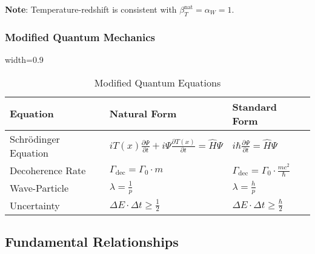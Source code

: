 \documentclass[12pt,a4paper]{article}
\newcommand{\Tfield}{T(x)}
\newcommand{\tablescale}{0.9}
\begin{document}
	\textbf{Note}: Temperature-redshift is consistent with \(\beta_T^{\text{nat}} = \alpha_W = 1\).
	
	\subsubsection{Modified Quantum Mechanics}
	\label{subsec:quantum}
	
	\begin{table}[htbp]
		\centering
		\begin{adjustbox}{width=\tablescale\textwidth}
			\begin{tabular}{lll}
				\toprule
				\textbf{Equation} & \textbf{Natural Form} & \textbf{Standard Form} \\
				\midrule
				Schrödinger Equation & \(i \Tfield \frac{\partial \Psi}{\partial t} + i \Psi \frac{\partial \Tfield}{\partial t} = \hat{H} \Psi\) & \(i \hbar \frac{\partial \Psi}{\partial t} = \hat{H} \Psi\) \\
				Decoherence Rate & \(\Gamma_{\text{dec}} = \Gamma_0 \cdot m\) & \(\Gamma_{\text{dec}} = \Gamma_0 \cdot \frac{m c^2}{\hbar}\) \\
				Wave-Particle & \(\lambda = \frac{1}{p}\) & \(\lambda = \frac{h}{p}\) \\
				Uncertainty & \(\Delta E \cdot \Delta t \geq \frac{1}{2}\) & \(\Delta E \cdot \Delta t \geq \frac{\hbar}{2}\) \\
				\bottomrule
			\end{tabular}
		\end{adjustbox}
		\caption{Modified Quantum Equations}
		\label{tab:qm_equations}
	\end{table}
	
	\subsection{Fundamental Relationships}
	\label{subsec:relationships}
	
\end{document}
